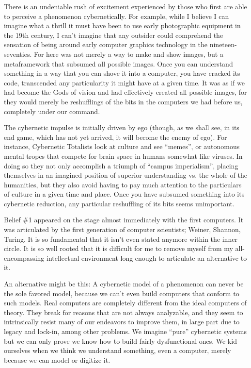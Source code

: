 \documentclass[letterpaper,12pt,english]{sphinxmanual}
\begin{document}
There is an undeniable rush of excitement experienced by those who first are able to perceive a phenomenon cybernetically. For example, while I believe I can imagine what a thrill it must have been to use early photographic equipment in the 19th century, I can't imagine that any outsider could comprehend the sensation of being around early computer graphics technology in the nineteen-seventies. For here was not merely a way to make and show images, but a metaframework that subsumed all possible images. Once you can understand something in a way that you can shove it into a computer, you have cracked its code, transcended any particularity it might have at a given time. It was as if we had become the Gods of vision and had effectively created all possible images, for they would merely be reshufflings of the bits in the computers we had before us, completely under our command.

The cybernetic impulse is initially driven by ego (though, as we shall see, in its end game, which has not yet arrived, it will become the enemy of ego). For instance, Cybernetic Totalists look at culture and see ``memes'', or autonomous mental tropes that compete for brain space in humans somewhat like viruses. In doing so they not only accomplish a triumph of ``campus imperialism'', placing themselves in an imagined position of superior understanding vs. the whole of the humanities, but they also avoid having to pay much attention to the particulars of culture in a given time and place. Once you have subsumed something into its cybernetic reduction, any particular reshuffling of its bits seems unimportant.

Belief \#1 appeared on the stage almost immediately with the first computers. It was articulated by the first generation of computer scientists; Weiner, Shannon, Turing. It is so fundamental that it isn't even stated anymore within the inner circle. It is so well rooted that it is difficult for me to remove myself from my all-encompassing intellectual environment long enough to articulate an alternative to it.

An alternative might be this: A cybernetic model of a phenomenon can never be the sole favored model, because we can't even build computers that conform to such models. Real computers are completely different from the ideal computers of theory. They break for reasons that are not always analyzable, and they seem to intrinsically resist many of our endeavors to improve them, in large part due to legacy and lock-in, among other problems. We imagine ``pure'' cybernetic systems but we can only prove we know how to build fairly dysfunctional ones. We kid ourselves when we think we understand something, even a computer, merely because we can model or digitize it.
\end{document}
